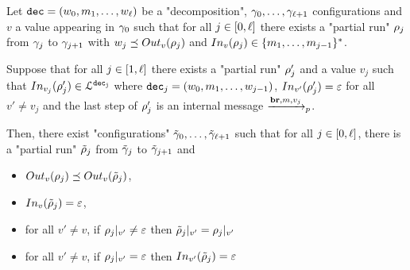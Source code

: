 \begin{lemma}
	\label{lem:follower-composition-completion}
	Let $\decsymb = (w_0, m_1, \ldots, w_\ell)$ be a "decomposition", $\config_0, \ldots, \config_{\ell+1}$ configurations and $v$ a value appearing in $\config_0$ such that for all $j \in\nset{0}{\ell}$ there exists a "partial run" $\run_j$ from $\config_{j}$ to $\config_{j+1}$ with $w_j \subword \voutput{v}{\run_j}$ and $\vinput{v}{\run_j} \in \set{m_1,\ldots, m_{j-1}}^*$. 
	
	Suppose that for all $j \in\nset{1}{\ell}$ there exists a "partial run" $\run'_j$ and a value $v_j$ such that $\vinput{v_j}{\run'_j} \in \langdec{\decsymb_j}$ where $\decsymb_j = (w_0, m_1, \ldots, w_{j-1})$, $\vinput{v'}{\run'_j} = \varepsilon$ for all $v' \neq v_j$ and the last step of $\run'_j$ is an internal message $\intmessage{m}{v_j}$.
	
	Then, there exist "configurations" $\Tilde{\config}_0, \ldots, \Tilde{\config}_{\ell+1}$ such that for all $j \in\nset{0}{\ell}$, there is a "partial run" $\Tilde{\run}_j$ from $\Tilde{\config}_j$ to $\Tilde{\config}_{j+1}$ and
	\begin{itemize}
		\item $\voutput{v}{\run_j} \subword \voutput{v}{\Tilde{\run}_j}$, 
		
		\item $\vinput{v}{\Tilde{\run}_j} = \varepsilon$,
		
		\item for all $v' \neq v$, if $\vproj{v'}{\run_j} \neq \varepsilon$ then $\vproj{v'}{\Tilde{\run}_j} = \vproj{v'}{\run_j}$
		
		\item for all $v' \neq v$, if $\vproj{v'}{\run_j} = \varepsilon$ then $\vinput{v'}{\Tilde{\run}_j} = \varepsilon$
\end{itemize}
\end{lemma}


